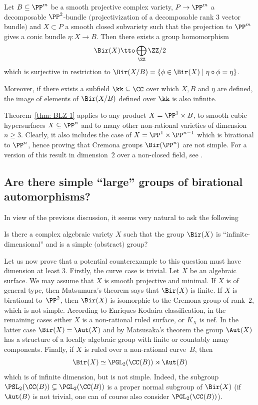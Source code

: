 \begin{thm}\label{thm: BLZ 1}
Let $B\subseteq \PP^m$ be a smooth projective complex variety, $P\to \PP^m$ a decomposable $\PP^2$-bundle $($projectivization of a decomposable rank $3$ vector bundle$)$ and $X\subset P$ a smooth closed subvariety such that the projection to $\PP^m$ gives a conic bundle $\eta\colon X\to B$.
Then there exists a group homomorphism
\[\Bir(X)\tto \bigoplus_\ZZ \ZZ/2\]
which is surjective in restriction to $\Bir(X/B)=\{\phi\in \Bir(X)\mid \eta\circ\phi=\eta\}$.

Moreover, if there exists a subfield $\kk\subseteq \CC$ over which $X,B$ and $\eta$ are defined, the image of elements of $\Bir(X/B)$ defined over $\kk$ is also infinite.
\end{thm}

Theorem~\ref{thm: BLZ 1} applies to any product $X = \PP^1 \times B$, to smooth cubic hypersurfaces $X \subseteq \PP^{n}$ and to many other non-rational varieties of dimension $n \ge 3$. Clearly, it also includes the case of $X = \PP^1 \times \PP^{n-1}$ which is birational to $\PP^n$, hence proving that Cremona groups $\Bir(\PP^n)$ are not simple. For a version of this result in dimension~$2$ over a non-closed field, see \cite{Schneider}.

\subsection{Are there simple ``large'' groups of birational automorphisms?} In view of the previous discussion, it seems very natural to ask the following

\begin{question}[S. Cantat]
Is there a complex algebraic variety $X$ such that the group $\Bir(X)$ is ``infinite-dimensional'' and is a simple $($abstract$)$ group?
\end{question}

Let us now prove that a potential counterexample to this question must have dimension at least $3$. Firstly, the curve case is trivial. Let $X$ be an algebraic surface. We may assume that $X$ is smooth projective and minimal. If $X$ is of general type, then Matsumura's theorem \cite{Matsumura} says that $\Bir(X)$ is finite. If $X$ is birational to~$\PP^2$, then $\Bir(X)$ is isomorphic to the Cremona group of rank~$2$, which is not simple. According to Enriques-Kodaira classification, in the remaining cases either $X$ is a non-rational ruled surface, or $K_X$ is nef. In the latter case $\Bir(X)=\Aut(X)$ and by Matsusaka's theorem \cite{Matsusaka} the group $\Aut(X)$ has a structure of a locally algebraic group with finite or countably many components. Finally, if $X$ is ruled over a non-rational curve~$B$, then
\[
\Bir(X)\simeq\PGL_2(\CC(B))\rtimes\Aut(B)
\]
which is of infinite dimension, but is not simple. Indeed, the subgroup $\PSL_2(\CC(B))\subsetneq \PGL_2(\CC(B))$ is a proper normal subgroup of $\Bir(X)$ (if $\Aut(B)$ is not trivial, one can of course also consider $\PGL_2(\CC(B))$).

